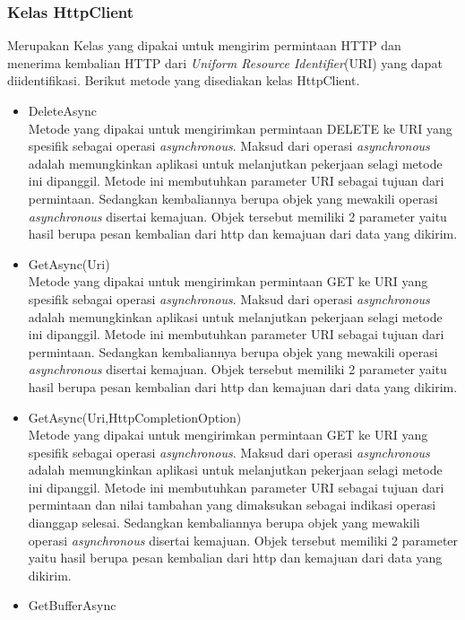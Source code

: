 \subsubsection{Kelas HttpClient}
\label{subsubsec:Kelas HttpClient}
\hspace{0.5cm} Merupakan Kelas yang dipakai untuk mengirim permintaan HTTP dan menerima kembalian HTTP dari \textit{Uniform Resource Identifier}(URI) yang dapat diidentifikasi. Berikut metode yang disediakan kelas HttpClient.
\begin{itemize}
	\item DeleteAsync \\
	Metode yang dipakai untuk mengirimkan permintaan DELETE ke URI yang spesifik sebagai operasi \textit{asynchronous}. Maksud dari operasi \textit{asynchronous} adalah memungkinkan aplikasi untuk melanjutkan pekerjaan selagi metode ini dipanggil\footnotemark[2]. Metode ini membutuhkan parameter URI sebagai tujuan dari permintaan. Sedangkan kembaliannya berupa objek yang mewakili operasi \textit{asynchronous} disertai kemajuan. Objek tersebut memiliki 2 parameter yaitu hasil berupa pesan kembalian dari http dan kemajuan dari data yang dikirim.
	\item GetAsync(Uri) \\
	Metode yang dipakai untuk mengirimkan permintaan GET ke URI yang spesifik sebagai operasi \textit{asynchronous}. Maksud dari operasi \textit{asynchronous} adalah memungkinkan aplikasi untuk melanjutkan pekerjaan selagi metode ini dipanggil\footnotemark[2]. Metode ini membutuhkan parameter URI sebagai tujuan dari permintaan. Sedangkan kembaliannya berupa objek yang mewakili operasi \textit{asynchronous} disertai kemajuan. Objek tersebut memiliki 2 parameter yaitu hasil berupa pesan kembalian dari http dan kemajuan dari data yang dikirim.
	\item GetAsync(Uri,HttpCompletionOption) \\
	Metode yang dipakai untuk mengirimkan permintaan GET ke URI yang spesifik sebagai operasi \textit{asynchronous}. Maksud dari operasi \textit{asynchronous} adalah memungkinkan aplikasi untuk melanjutkan pekerjaan selagi metode ini dipanggil\footnotemark[2]. Metode ini membutuhkan parameter URI sebagai tujuan dari permintaan dan nilai tambahan yang dimaksukan sebagai indikasi operasi dianggap selesai. Sedangkan kembaliannya berupa objek yang mewakili operasi \textit{asynchronous} disertai kemajuan. Objek tersebut memiliki 2 parameter yaitu hasil berupa pesan kembalian dari http dan kemajuan dari data yang dikirim.
	\item GetBufferAsync \\

\end{itemize}
